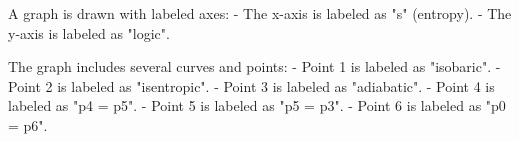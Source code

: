 A graph is drawn with labeled axes:  
- The x-axis is labeled as "s" (entropy).  
- The y-axis is labeled as "logic".  

The graph includes several curves and points:  
- Point 1 is labeled as "isobaric".  
- Point 2 is labeled as "isentropic".  
- Point 3 is labeled as "adiabatic".  
- Point 4 is labeled as "p4 = p5".  
- Point 5 is labeled as "p5 = p3".  
- Point 6 is labeled as "p0 = p6".